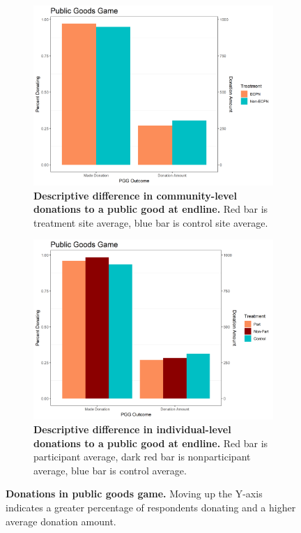 \documentclass[11pt]{article}
\begin{document}
\begin{figure}[H]
    \begin{subfigure}[b]{.48\textwidth}
    \centering
        \includegraphics[width=\linewidth]{../../../figs/pggComm_plot.png}
        \caption{\textbf{Descriptive difference in community-level donations to a public good at endline.} Red bar is treatment site average, blue bar is control site average.}
        \label{fig:pggComm}
    \end{subfigure}
    \hfill
    \begin{subfigure}[b]{.48\textwidth}
    \centering
        \includegraphics[width=\linewidth]{../../../figs/pggPan_plot.png}
        \caption{\textbf{Descriptive difference in individual-level donations to a public good at endline.} Red bar is participant average, dark red bar is nonparticipant average, blue bar is control average.}
        \label{fig:pggPan}
    \end{subfigure}
    \caption{\textbf{Donations in public goods game.}  Moving up the Y-axis indicates a greater percentage of respondents donating and a higher average donation amount.}
\end{figure}
\end{document}
